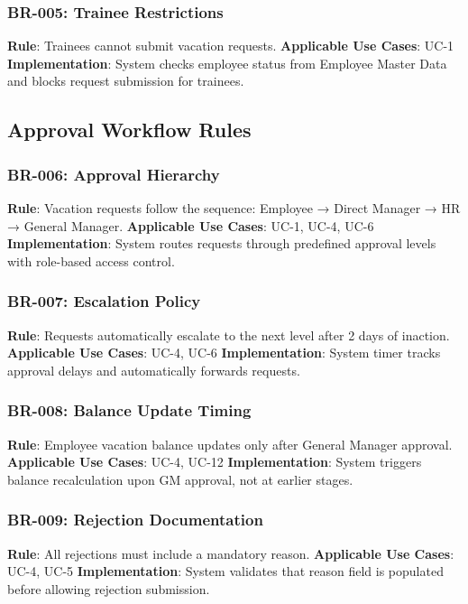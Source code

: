 \documentclass[12pt,a4paper]{article}
\begin{document}
\subsubsection{BR-005: Trainee Restrictions}
\textbf{Rule}: Trainees cannot submit vacation requests.
\textbf{Applicable Use Cases}: UC-1
\textbf{Implementation}: System checks employee status from Employee Master Data and blocks request submission for trainees.

\subsection{Approval Workflow Rules}

\subsubsection{BR-006: Approval Hierarchy}
\textbf{Rule}: Vacation requests follow the sequence: Employee → Direct Manager → HR → General Manager.
\textbf{Applicable Use Cases}: UC-1, UC-4, UC-6
\textbf{Implementation}: System routes requests through predefined approval levels with role-based access control.

\subsubsection{BR-007: Escalation Policy}
\textbf{Rule}: Requests automatically escalate to the next level after 2 days of inaction.
\textbf{Applicable Use Cases}: UC-4, UC-6
\textbf{Implementation}: System timer tracks approval delays and automatically forwards requests.

\subsubsection{BR-008: Balance Update Timing}
\textbf{Rule}: Employee vacation balance updates only after General Manager approval.
\textbf{Applicable Use Cases}: UC-4, UC-12
\textbf{Implementation}: System triggers balance recalculation upon GM approval, not at earlier stages.

\subsubsection{BR-009: Rejection Documentation}
\textbf{Rule}: All rejections must include a mandatory reason.
\textbf{Applicable Use Cases}: UC-4, UC-5
\textbf{Implementation}: System validates that reason field is populated before allowing rejection submission.
\end{document}
